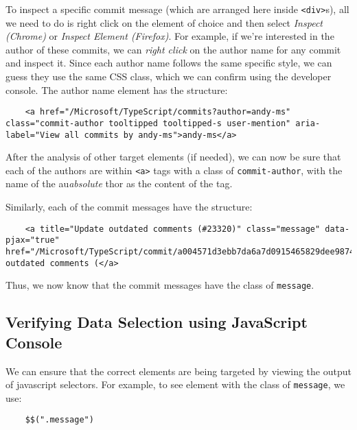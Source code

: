 To inspect a specific commit message (which are arranged here inside \verb|<div>|s), all we need to do is right click on the element of choice and then select \textit{Inspect (Chrome)} or \textit{Inspect Element (Firefox)}. For example, if we're interested in the author of these commits, we can \textit{right click} on the author name for any commit and inspect it. Since each author name follows the same specific style, we can guess they use the same CSS class, which we can confirm using the developer console. The author name element has the structure:

\vspace{-15pt}
\begin{verbatim}
	<a href="/Microsoft/TypeScript/commits?author=andy-ms" class="commit-author tooltipped tooltipped-s user-mention" aria-label="View all commits by andy-ms">andy-ms</a>
\end{verbatim}
\vspace{-10pt}	

\noindent
After the analysis of other target elements (if needed), we can now be sure that each of the authors are within \verb|<a>| tags with a class of \verb|commit-author|, with the name of the au\textit{absolute} thor as the content of the tag. 

Similarly, each of the commit messages have the structure:

\vspace{-15pt}
\begin{verbatim}
	<a title="Update outdated comments (#23320)" class="message" data-pjax="true" href="/Microsoft/TypeScript/commit/a004571d3ebb7da6a7d0915465829dee9874e495">Update outdated comments (</a>
\end{verbatim}
\vspace{-10pt}	

\noindent
Thus, we now know that the commit messages have the class of \verb|message|.

\subsection{Verifying Data Selection using JavaScript Console} 
We can ensure that the correct elements are being targeted by viewing the output of javascript selectors. For example, to see element with the class of \verb|message|, we use:

\vspace{-15pt}
\begin{verbatim}
	$$(".message")
\end{verbatim}
\vspace{-10pt}	

